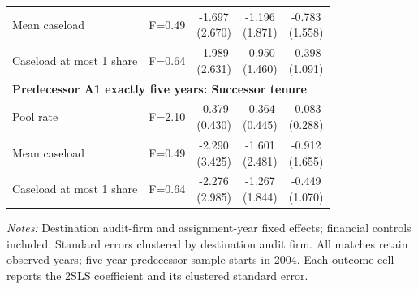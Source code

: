 \begin{table}[htbp]
\begin{threeparttable}
\begin{tabular}{p{}cccc}
Mean caseload & F=0.49 & \shortstack{-1.697\\(2.670)} & \shortstack{-1.196\\(1.871)} & \shortstack{-0.783\\(1.558)} \\
Caseload at most 1 share & F=0.64 & \shortstack{-1.989\\(2.631)} & \shortstack{-0.950\\(1.460)} & \shortstack{-0.398\\(1.091)} \\
\multicolumn{5}{l}{\textbf{Predecessor A1 exactly five years: Successor tenure}} \\
Pool rate & F=2.10 & \shortstack{-0.379\\(0.430)} & \shortstack{-0.364\\(0.445)} & \shortstack{-0.083\\(0.288)} \\
Mean caseload & F=0.49 & \shortstack{-2.290\\(3.425)} & \shortstack{-1.601\\(2.481)} & \shortstack{-0.912\\(1.655)} \\
Caseload at most 1 share & F=0.64 & \shortstack{-2.276\\(2.985)} & \shortstack{-1.267\\(1.844)} & \shortstack{-0.449\\(1.070)} \\
\bottomrule
\end{tabular}
\begin{tablenotes}\footnotesize
\item \raggedright \textit{Notes:} Destination audit-firm and assignment-year fixed effects; financial controls included. Standard errors clustered by destination audit firm. All matches retain observed years; five-year predecessor sample starts in 2004. Each outcome cell reports the 2SLS coefficient and its clustered standard error.
\end{tablenotes}
\end{threeparttable}
\end{table}

